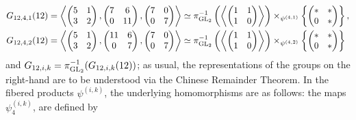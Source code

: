 \begin{equation}
\begin{split}
G_{12,4,1}(12) &= \left\langle \begin{pmatrix} 5 & 1 \\ 3 & 2 \end{pmatrix}, \begin{pmatrix} 7 & 6 \\ 0 & 11 \end{pmatrix}, \begin{pmatrix} 7 & 0 \\ 0 & 7 \end{pmatrix} \right\rangle \simeq \pi_{\operatorname{GL}_2}^{-1} \left( \left\langle \begin{pmatrix} 1 & 1 \\ 1 & 0 \end{pmatrix} \right\rangle \right) \times_{\psi^{(4,1)}} \left\{ \begin{pmatrix} * & * \\ 0 & * \end{pmatrix} \right\}, \\
G_{12,4,2}(12) &= \left\langle \begin{pmatrix} 5 & 1 \\ 3 & 2 \end{pmatrix}, \begin{pmatrix} 11 & 6 \\ 0 & 7 \end{pmatrix}, \begin{pmatrix} 7 & 0 \\ 0 & 7 \end{pmatrix} \right\rangle \simeq \pi_{\operatorname{GL}_2}^{-1} \left( \left\langle \begin{pmatrix} 1 & 1 \\ 1 & 0 \end{pmatrix} \right\rangle \right) \times_{\psi^{(4,2)}} \left\{ \begin{pmatrix} * & * \\ 0 & * \end{pmatrix} \right\}
\end{split}
\end{equation}
and $G_{12,i,k} = \pi_{\operatorname{GL}_2}^{-1}(G_{12,i,k}(12))$; as usual, the representations of the groups on the right-hand are to be understood via the Chinese Remainder Theorem.
In the fibered products $\psi^{(i,k)}$, the underlying homomorphisms are as follows: the maps $\psi_4^{(i,k)}$, are defined by
